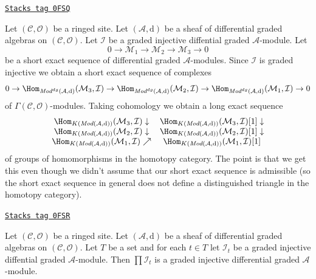\begin{remark}
\label{sdga-remark-why-graded-injective}
\href{https://stacks.math.columbia.edu/tag/0FSQ}{\texttt{Stacks tag 0FSQ}}

Let $(\mathcal{C}, \mathcal{O})$ be a ringed site.
Let $(\mathcal{A}, \text{d})$ be a sheaf of differential graded algebras
on $(\mathcal{C}, \mathcal{O})$. Let $\mathcal{I}$ be a graded injective
diffential graded $\mathcal{A}$-module. Let
$$
0 \to \mathcal{M}_1 \to \mathcal{M}_2 \to \mathcal{M}_3 \to 0
$$
be a short exact sequence of differential graded $\mathcal{A}$-modules.
Since $\mathcal{I}$ is graded injective
we obtain a short exact sequence of complexes
$$
0 \to
\Hom_{\textit{Mod}^{dg}(\mathcal{A}, \text{d})}(\mathcal{M}_3, \mathcal{I})
\to
\Hom_{\textit{Mod}^{dg}(\mathcal{A}, \text{d})}(\mathcal{M}_2, \mathcal{I})
\to
\Hom_{\textit{Mod}^{dg}(\mathcal{A}, \text{d})}(\mathcal{M}_1, \mathcal{I})
\to 0
$$
of $\Gamma(\mathcal{C}, \mathcal{O})$-modules. Taking cohomology we
obtain a long exact sequence
$$
\begin{array}{cc}\Hom_{K(\textit{Mod}(\mathcal{A}, \text{d}))}(\mathcal{M}_3, \mathcal{I})
\downarrow & \Hom_{K(\textit{Mod}(\mathcal{A}, \text{d}))}(\mathcal{M}_3, \mathcal{I})[1]
\downarrow \\ \Hom_{K(\textit{Mod}(\mathcal{A}, \text{d}))}(\mathcal{M}_2, \mathcal{I})
\downarrow & \Hom_{K(\textit{Mod}(\mathcal{A}, \text{d}))}(\mathcal{M}_2, \mathcal{I})[1]
\downarrow \\ \Hom_{K(\textit{Mod}(\mathcal{A}, \text{d}))}(\mathcal{M}_1, \mathcal{I})
\nearrow & \Hom_{K(\textit{Mod}(\mathcal{A}, \text{d}))}(\mathcal{M}_1, \mathcal{I})[1]\end{array}
$$
of groups of homomorphisms in the homotopy category. The point is that
we get this even though we didn't assume that our short exact sequence
is admissible (so the short exact sequence in general does not define
a distinguished triangle in the homotopy category).
\end{remark}

\begin{lemma}
\label{sdga-lemma-product-graded-injective}
\href{https://stacks.math.columbia.edu/tag/0FSR}{\texttt{Stacks tag 0FSR}}

Let $(\mathcal{C}, \mathcal{O})$ be a ringed site.
Let $(\mathcal{A}, \text{d})$ be a sheaf of differential graded algebras
on $(\mathcal{C}, \mathcal{O})$. Let $T$ be a set and for
each $t \in T$ let $\mathcal{I}_t$ be a graded injective
diffential graded $\mathcal{A}$-module. Then
$\prod \mathcal{I}_t$ is a graded injective differential
graded $\mathcal{A}$-module.
\end{lemma}

